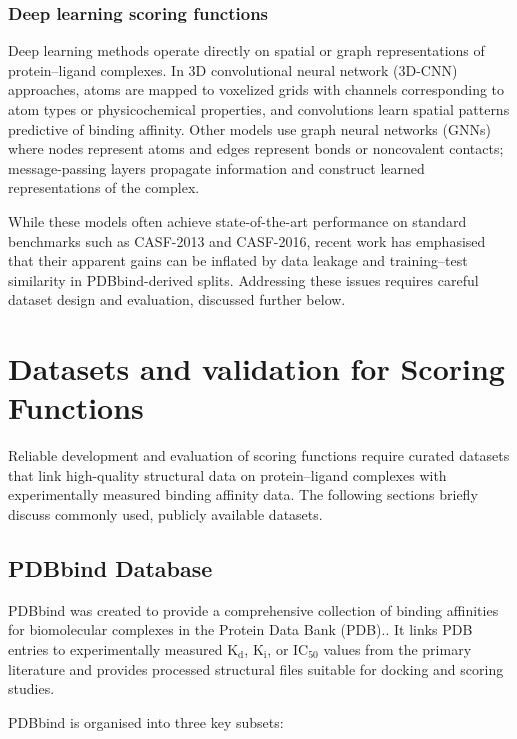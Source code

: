 \documentclass[12pt]{article}
\begin{document}
\subsubsection{Deep learning scoring functions}
Deep learning methods operate directly on spatial or graph representations of protein--ligand complexes. In 3D convolutional neural network (3D-CNN) approaches, atoms are mapped to voxelized grids with channels corresponding to atom types or physicochemical properties, and convolutions learn spatial patterns predictive of binding affinity\cite{CH3_Jimenez2018_KDEEP}. Other models use graph neural networks (GNNs) where nodes represent atoms and edges represent bonds or noncovalent contacts; message-passing layers propagate information and construct learned representations of the complex\cite{CH3_Wang2017}.

While these models often achieve state-of-the-art performance on standard benchmarks such as CASF-2013 and CASF-2016, recent work has emphasised that their apparent gains can be inflated by data leakage and training--test similarity in PDBbind-derived splits.\cite{CH3_li2021machine,CH3_li2017structural} Addressing these issues requires careful dataset design and evaluation, discussed further below.

\section{Datasets and validation for Scoring Functions}
Reliable development and evaluation of scoring functions require curated datasets that link high-quality structural data on protein--ligand complexes with experimentally measured binding affinity data. The following sections briefly discuss commonly used, publicly available datasets. 

\subsection{PDBbind Database}
PDBbind was created to provide a comprehensive collection of binding affinities for biomolecular complexes in the Protein Data Bank (PDB).\cite{CH3_Wang2004_PDBbind,CH3_Wang2005_PDBbind,CH3_Liu2015_PDBbind}. It links PDB entries to experimentally measured $\textrm{K}_\textrm{d}$, $\textrm{K}_\textrm{i}$, or IC$_{\textrm{50}}$ values from the primary literature and provides processed structural files suitable for docking and scoring studies.

PDBbind is organised into three key subsets:
\end{document}
